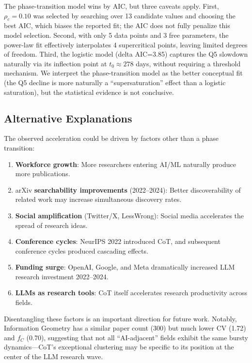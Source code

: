 \documentclass[12pt]{article}
\begin{document}
The phase-transition model wins by AIC, but three caveats apply. First, $\rho_c=0.10$ was selected by searching over 13 candidate values and choosing the best AIC, which biases the reported fit; the AIC does not fully penalize this model selection. Second, with only 5 data points and 3 free parameters, the power-law fit effectively interpolates 4 supercritical points, leaving limited degrees of freedom. Third, the logistic model (delta AIC=3.85) captures the Q5 slowdown naturally via its inflection point at $t_0\approx278$ days, without requiring a threshold mechanism. We interpret the phase-transition model as the better conceptual fit (the Q5 decline is more naturally a ``supersaturation'' effect than a logistic saturation), but the statistical evidence is not conclusive.

\subsection{Alternative Explanations}

The observed acceleration could be driven by factors other than a phase transition:
\begin{enumerate}
    \item \textbf{Workforce growth}: More researchers entering AI/ML naturally produce more publications.
    \item arXiv \textbf{searchability improvements} (2022--2024): Better discoverability of related work may increase simultaneous discovery rates.
    \item \textbf{Social amplification} (Twitter/X, LessWrong): Social media accelerates the spread of research ideas.
    \item \textbf{Conference cycles}: NeurIPS 2022 introduced CoT, and subsequent conference cycles produced cascading effects.
    \item \textbf{Funding surge}: OpenAI, Google, and Meta dramatically increased LLM research investment 2022--2024.
    \item \textbf{LLMs as research tools}: CoT itself accelerates research productivity across fields.
\end{enumerate}
Disentangling these factors is an important direction for future work. Notably, Information Geometry has a similar paper count (300) but much lower CV (1.72) and $f_C$ (0.70), suggesting that not all ``AI-adjacent'' fields exhibit the same bursty dynamics---CoT's exceptional clustering may be specific to its position at the center of the LLM research wave.
\end{document}
